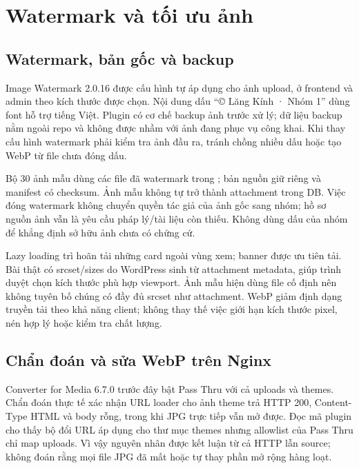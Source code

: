\section{Watermark và tối ưu ảnh}
\subsection{Watermark, bản gốc và backup}
Image Watermark 2.0.16 được cấu hình tự áp dụng cho ảnh upload, ở frontend và admin theo kích thước được chọn. Nội dung dấu ``© Lăng Kính · Nhóm 1'' dùng font hỗ trợ tiếng Việt. Plugin có cơ chế backup ảnh trước xử lý; dữ liệu backup nằm ngoài repo và không được nhầm với ảnh đang phục vụ công khai. Khi thay cấu hình watermark phải kiểm tra ảnh đầu ra, tránh chồng nhiều dấu hoặc tạo WebP từ file chưa đóng dấu.

Bộ 30 ảnh mẫu dùng các file đã watermark trong ; bản nguồn giữ riêng và manifest có checksum. Ảnh mẫu không tự trở thành attachment trong DB. Việc đóng watermark không chuyển quyền tác giả của ảnh gốc sang nhóm; hồ sơ nguồn ảnh vẫn là yêu cầu pháp lý/tài liệu còn thiếu. Không dùng dấu của nhóm để khẳng định sở hữu ảnh chưa có chứng cứ.

Lazy loading trì hoãn tải những card ngoài vùng xem; banner được ưu tiên tải. Bài thật có srcset/sizes do WordPress sinh từ attachment metadata, giúp trình duyệt chọn kích thước phù hợp viewport. Ảnh mẫu hiện dùng file cố định nên không tuyên bố chúng có đầy đủ srcset như attachment. WebP giảm định dạng truyền tải theo khả năng client; không thay thế việc giới hạn kích thước pixel, nén hợp lý hoặc kiểm tra chất lượng.

\subsection{Chẩn đoán và sửa WebP trên Nginx}
Converter for Media 6.7.0 trước đây bật Pass Thru với cả uploads và themes. Chẩn đoán thực tế xác nhận URL loader cho ảnh theme trả HTTP 200, Content-Type HTML và body rỗng, trong khi JPG trực tiếp vẫn mở được. Đọc mã plugin cho thấy bộ đổi URL áp dụng cho thư mục themes nhưng allowlist của Pass Thru chỉ map uploads. Vì vậy nguyên nhân được kết luận từ cả HTTP lẫn source; không đoán rằng mọi file JPG đã mất hoặc tự thay phần mở rộng hàng loạt.

